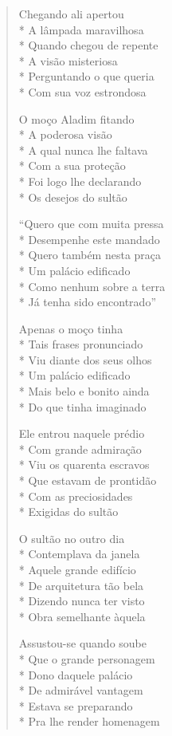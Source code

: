 \begin{verse}
Chegando ali apertou\\*
A lâmpada maravilhosa\\*
Quando chegou de repente\\*
A visão misteriosa\\*
Perguntando o que queria\\*
Com sua voz estrondosa

O moço Aladim fitando\\*
A poderosa visão\\*
A qual nunca lhe faltava\\*
Com a sua proteção\\*
Foi logo lhe declarando\\*
Os desejos do sultão

``Quero que com muita pressa\\*
Desempenhe este mandado\\*
Quero também nesta praça\\*
Um palácio edificado\\*
Como nenhum sobre a terra\\*
Já tenha sido encontrado''

Apenas o moço tinha\\*
Tais frases pronunciado\\*
Viu diante dos seus olhos\\*
Um palácio edificado\\*
Mais belo e bonito ainda\\*
Do que tinha imaginado

Ele entrou naquele prédio\\*
Com grande admiração\\*
Viu os quarenta escravos\\*
Que estavam de prontidão\\*
Com as preciosidades\\*
Exigidas do sultão

O sultão no outro dia\\*
Contemplava da janela\\*
Aquele grande edifício\\*
De arquitetura tão bela\\*
Dizendo nunca ter visto\\*
Obra semelhante àquela

Assustou-se quando soube\\*
Que o grande personagem\\*
Dono daquele palácio\\*
De admirável vantagem\\*
Estava se preparando\\*
Pra lhe render homenagem


\end{verse}
